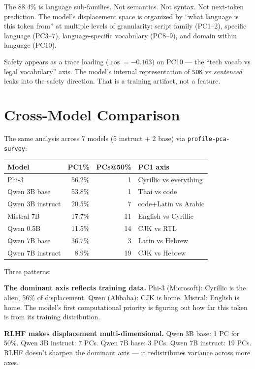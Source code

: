 \documentclass[11pt,a4paper]{report}
\begin{document}
The 88.4\% is language sub-families. Not semantics. Not syntax. Not next-token prediction. The model's displacement space is organized by ``what language is this token from'' at multiple levels of granularity: script family (PC1--2), specific language (PC3--7), language-specific vocabulary (PC8--9), and domain within language (PC10).

Safety appears as a trace loading ($\cos = -0.163$) on PC10 --- the ``tech vocab vs legal vocabulary'' axis. The model's internal representation of \texttt{SDK} vs \textit{sentenced} leaks into the safety direction. That is a training artifact, not a feature.

\section{Cross-Model Comparison}

The same analysis across 7 models (5 instruct + 2 base) via \texttt{profile-pca-survey}:

\begin{center}
\begin{tabular}{lrrl}
\toprule
\textbf{Model} & \textbf{PC1\%} & \textbf{PCs@50\%} & \textbf{PC1 axis} \\
\midrule
Phi-3 & 56.2\% & 1 & Cyrillic vs everything \\
Qwen 3B base & 53.8\% & 1 & Thai vs code \\
Qwen 3B instruct & 20.5\% & 7 & code+Latin vs Arabic \\
Mistral 7B & 17.7\% & 11 & English vs Cyrillic \\
Qwen 0.5B & 11.5\% & 14 & CJK vs RTL \\
Qwen 7B base & 36.7\% & 3 & Latin vs Hebrew \\
Qwen 7B instruct & 8.9\% & 19 & CJK vs Hebrew \\
\bottomrule
\end{tabular}
\end{center}

Three patterns:

\textbf{The dominant axis reflects training data.} Phi-3 (Microsoft): Cyrillic is the alien, 56\% of displacement. Qwen (Alibaba): CJK is home. Mistral: English is home. The model's first computational priority is figuring out how far this token is from its training distribution.

\textbf{RLHF makes displacement multi-dimensional.} Qwen 3B base: 1 PC for 50\%. Qwen 3B instruct: 7 PCs. Qwen 7B base: 3 PCs. Qwen 7B instruct: 19 PCs. RLHF doesn't sharpen the dominant axis --- it redistributes variance across more axes.
\end{document}
